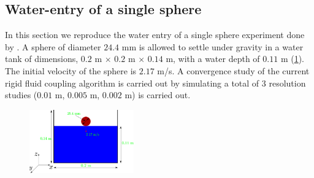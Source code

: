 \FloatBarrier%
\subsection{Water-entry of a single sphere}
\label{sec:water-entry-sphere}

In this section we reproduce the water entry of a single sphere experiment
done by \citep{aristoff_water_2010}. A sphere of diameter $24.4$ mm is allowed
to settle under gravity in a water tank of dimensions, $0.2$ m $\times$ $0.2$
m $\times$ $0.14$ m, with a water depth of $0.11$ m
(\cref{fig:water-entry-sphere-schematic}). The initial velocity of the sphere
is $2.17$ m/s. A convergence study of the current rigid fluid coupling
algorithm is carried out by simulating a total of 3 resolution studies ($0.01$
m, $0.005$ m, $0.002$ m) is carried out.
\begin{figure}[!htpb]
  \centering
  \includegraphics[width=0.4\textwidth]{images/rfc/images/water_entry_of_sphere/schematic}
  \caption{}
\label{fig:water-entry-sphere-schematic}
\end{figure}

